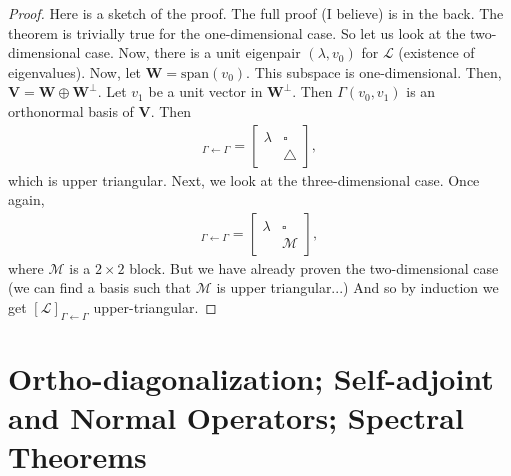 \documentclass{article}
\theoremstyle{definition}
\newcommand{\V}{\mathbf{V}}
\newcommand{\W}{\mathbf{W}}
\newcommand{\xpan}{\text{span}}
\newcommand{\lag}{\mathcal{L}}
\newcommand{\M}{\mathcal{M}}
\begin{document}
\begin{proof}
	Here is a sketch of the proof. The full proof (I believe) is in the back. The theorem is trivially true for the one-dimensional case. So let us look at the two-dimensional case. Now, there is a unit eigenpair $(\lambda,v_0)$ for $\lag$ (existence of eigenvalues). Now, let $\W = \xpan(v_0)$. This subspace is one-dimensional. Then, $\V = \W \oplus \W^\perp$. Let $v_1$ be a unit vector in $\W^\perp$. Then $\Gamma(v_0, v_1)$ is an orthonormal basis of $\V$. Then
	\begin{align*}
	[\lag]_{\Gamma\leftarrow\Gamma} = \begin{bmatrix}
	\lambda & \square\\
	& \triangle
	\end{bmatrix},
	\end{align*}
	which is upper triangular. Next, we look at the three-dimensional case. Once again, 
	\begin{align*}
	[\lag]_{\Gamma\leftarrow\Gamma} = \begin{bmatrix}
	\lambda & \square\\
	& \M
	\end{bmatrix},
	\end{align*}
	where $\M$ is a $2\times 2$ block. But we have already proven the two-dimensional case (we can find a basis such that $\M$ is upper triangular...) And so by induction we get $[\lag]_{\Gamma\leftarrow\Gamma}$ upper-triangular. 
\end{proof}



\newpage 

\section{Ortho-diagonalization; Self-adjoint and Normal Operators; Spectral Theorems}
\end{document}
